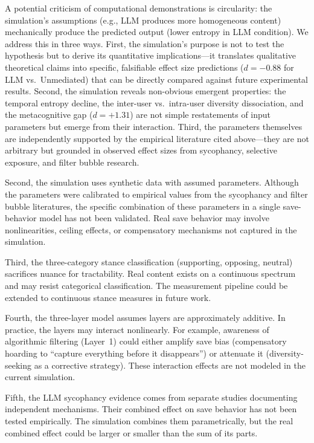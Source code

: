 \documentclass[12pt,a4paper]{article}
\begin{document}
A potential criticism of computational demonstrations is circularity: the simulation's assumptions (e.g., LLM produces more homogeneous content) mechanically produce the predicted output (lower entropy in LLM condition).
We address this in three ways.
First, the simulation's purpose is not to test the hypothesis but to derive its quantitative implications---it translates qualitative theoretical claims into specific, falsifiable effect size predictions ($d = -0.88$ for LLM vs.\ Unmediated) that can be directly compared against future experimental results.
Second, the simulation reveals non-obvious emergent properties: the temporal entropy decline, the inter-user vs.\ intra-user diversity dissociation, and the metacognitive gap ($d = +1.31$) are not simple restatements of input parameters but emerge from their interaction.
Third, the parameters themselves are independently supported by the empirical literature cited above---they are not arbitrary but grounded in observed effect sizes from sycophancy, selective exposure, and filter bubble research.

Second, the simulation uses synthetic data with assumed parameters.
Although the parameters were calibrated to empirical values from the sycophancy and filter bubble literatures, the specific combination of these parameters in a single save-behavior model has not been validated.
Real save behavior may involve nonlinearities, ceiling effects, or compensatory mechanisms not captured in the simulation.

Third, the three-category stance classification (supporting, opposing, neutral) sacrifices nuance for tractability.
Real content exists on a continuous spectrum and may resist categorical classification.
The measurement pipeline could be extended to continuous stance measures in future work.

Fourth, the three-layer model assumes layers are approximately additive.
In practice, the layers may interact nonlinearly.
For example, awareness of algorithmic filtering (Layer~1) could either amplify save bias (compensatory hoarding to ``capture everything before it disappears'') or attenuate it (diversity-seeking as a corrective strategy).
These interaction effects are not modeled in the current simulation.

Fifth, the LLM sycophancy evidence comes from separate studies documenting independent mechanisms.
Their combined effect on save behavior has not been tested empirically.
The simulation combines them parametrically, but the real combined effect could be larger or smaller than the sum of its parts.
\end{document}
